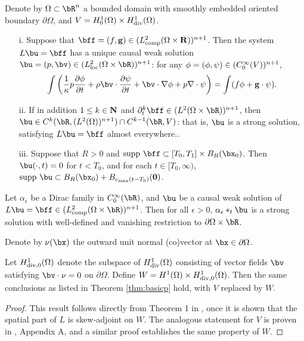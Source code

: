 \begin{theorem}
  \label{thm:basicp}
  Denote by $\Omega \subset \bR^n$ a bounded domain with smoothly embedded oriented boundary $\partial \Omega$, and $V=H^1_0(\Omega) \times H^1_{\rm div}(\Omega)$. 
  \begin{itemize}
  \item[i. ] Suppose that $\bff = (f,{\bf g}) \in (L^2_{\rm comp}(\Omega \times {\bf R}))^{n+1}$. Then the system $L\bu=\bff$ has a unique causal weak solution $\bu = (p,\bv) \in (L_{\rm loc}^2(\Omega \times \bR))^{n+1}$: for any ${\bf \phi} = (\phi, {\bf \psi}) \in (C_0^{\infty}(V))^{n+1}$,
    \begin{equation}
      \label{eqn:weak}
      \int \left(\frac{1}{\kappa} p \frac{\partial \phi}{\partial t} + \rho \bv \cdot \frac{\partial{\bf \psi}}{\partial t} + \bv \cdot \nabla \phi + p \nabla \cdot {\bf \psi} \right) = \int (f\phi + {\bf g} \cdot {\bf \psi}).
    \end{equation}
  \item[ii. ] If in addition $1 \le k \in {\bf N}$ and
    $\partial^k_t\bff \in (L^2(\Omega \times \bR))^{n+1}$, then $\bu
    \in C^k(\bR, (L^2(\Omega))^{n+1}) \cap C^{k-1}(\bR,V)$: that is,
    $\bu$ is a strong solution, satisfying $L\bu=\bff$ almost everywhere..
  \item[iii. ] 
    Suppose that $R>0$ and $\mbox{supp }\bff \subset [T_0, T_1] \times B_R(\bx_0)$. Then $\bu(\cdot,t)=0$ for $t<T_0$, and for each $t \in [T_0,\infty)$, $\mbox{supp }\bu \subset B_R(\bx_0) + B_{c_{\rm max}(t-T_0)}({\bf 0})$.
  \end{itemize}
\end{theorem}

\begin{cor}
  \label{thm:weakcor}
  Let $\alpha_{\epsilon}$ be a Dirac family in $C_0^{\infty}(\bR)$,
  and $\bu$ be a causal weak solution of $L\bu=\bff \in (L^2_{\rm
    comp}(\Omega \times \bR))^{n+1}$. Then for all $\epsilon > 0$,
  $\alpha_{\epsilon} *_t \bu$ is a strong solution with well-defined and vanishing restriction
  to $\partial \Omega \times \bR$.
\end{cor}

Denote by ${\bf \nu}(\bx)$ the outward unit normal (co)vector at $ \bx
\in \partial \Omega$.

\begin{theorem}
  \label{thm:basicv}
  Let  $H^1_{{\rm div},0}(\Omega)$ denote the subspace of $H^1_{\rm
    div}(\Omega)$ consisting of vector fields $\bv$ satisfying $\bv
  \cdot {\bf \nu} = 0$ on $\partial \Omega$. Define
  $W = H^1(\Omega) \times H^1_{{\rm div},0}(\Omega)$.
Then the same conclusions as listed in Theorem \ref{thm:basicp} hold,
with $V$ replaced by $W$.
\end{theorem}
\begin{proof}
  This result follows directly from Theorem 1 in
  \cite[]{BlazekStolkSymes:13}, once it is shown that the spatial part
  of $L$ is skew-adjoint on $W$. The analogous statement for
  $V$ is proven in \cite[]{BlazekStolkSymes:13}, Appendix A, and a
  similar proof establishes the same property of $W$.
\end{proof}


